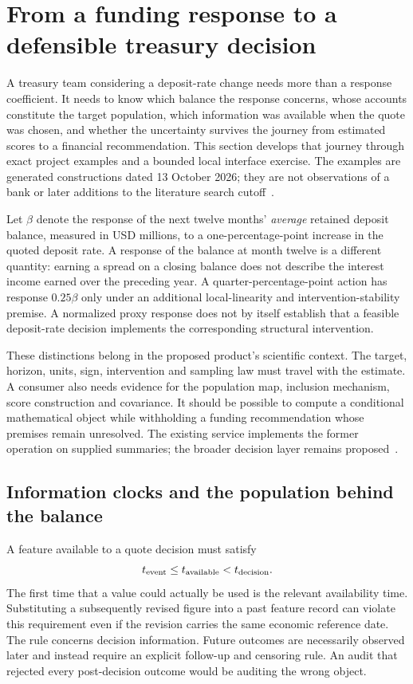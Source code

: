 \section{From a funding response to a defensible treasury decision}
\label{exec13:funding-journey}

A treasury team considering a deposit-rate change needs more than a response
coefficient. It needs to know which balance the response concerns, whose
accounts constitute the target population, which information was available
when the quote was chosen, and whether the uncertainty survives the journey
from estimated scores to a financial recommendation. This section develops
that journey through exact project examples and a bounded local interface
exercise. The examples are generated constructions dated 13 October 2026;
they are not observations of a bank or later additions to the literature
search cutoff~\citep{exec13_funding_exact,exec13_funding_runtime}.

Let $\beta$ denote the response of the next twelve months' \emph{average}
retained deposit balance, measured in USD millions, to a one-percentage-point
increase in the quoted deposit rate. A response of the balance at month twelve
is a different quantity: earning a spread on a closing balance does not
describe the interest income earned over the preceding year. A
quarter-percentage-point action has response $0.25\beta$ only under an
additional local-linearity and intervention-stability premise. A normalized
proxy response does not by itself establish that a feasible deposit-rate
decision implements the corresponding structural intervention.

These distinctions belong in the proposed product's scientific context.
The target, horizon, units, sign, intervention and sampling law must travel
with the estimate. A consumer also needs evidence for the population map,
inclusion mechanism, score construction and covariance. It should be possible
to compute a conditional mathematical object while withholding a funding
recommendation whose premises remain unresolved. The existing service
implements the former operation on supplied summaries; the broader decision
layer remains proposed~\citep{exec13_funding_service}.

\subsection{Information clocks and the population behind the balance}

A feature available to a quote decision must satisfy
\[
 t_{\rm event}\le t_{\rm available}<t_{\rm decision}.
\]
The first time that a value could actually be used is the relevant
availability time. Substituting a subsequently revised figure into a past
feature record can violate this requirement even if the revision carries
the same economic reference date. The rule concerns decision information.
Future outcomes are necessarily observed later and instead require an
explicit follow-up and censoring rule. An audit that rejected every
post-decision outcome would be auditing the wrong object.

